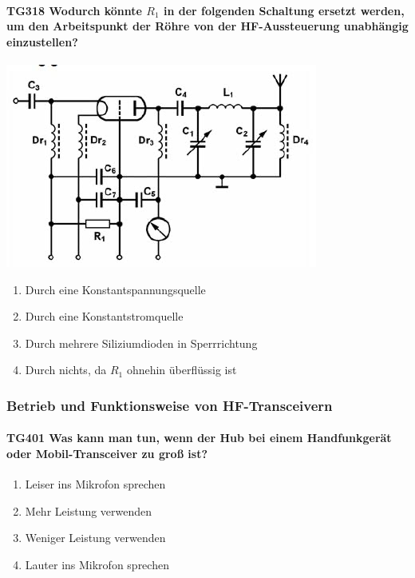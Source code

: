 \documentclass[8pt]{article}
\begin{document}
\paragraph*{TG318 Wodurch könnte $R_{1}$ in der folgenden Schaltung ersetzt werden, um den Arbeitspunkt der Röhre von der HF-Aussteuerung unabhängig einzustellen?}
\begin{center}
	\begin{minipage}{\linewidth}
		\centering
		\includegraphics[scale=1.0]{pics/tg318_a.jpg}
	\end{minipage}
\end{center}
\begin{enumerate}[nolistsep,label=\Alph*]
\item Durch eine Konstantspannungsquelle
\item Durch eine Konstantstromquelle
\item Durch mehrere Siliziumdioden in Sperrrichtung
\item Durch nichts, da $R_{1}$ ohnehin überflüssig ist
\end{enumerate}

\pagebreak
\subsubsection{Betrieb und Funktionsweise von HF-Transceivern}
\paragraph*{TG401 Was kann man tun, wenn der Hub bei einem Handfunkgerät oder Mobil-Transceiver zu groß ist?}
\begin{enumerate}[nolistsep,label=\Alph*]
\item Leiser ins Mikrofon sprechen
\item Mehr Leistung verwenden
\item Weniger Leistung verwenden
\item Lauter ins Mikrofon sprechen
\end{enumerate}
\end{document}

